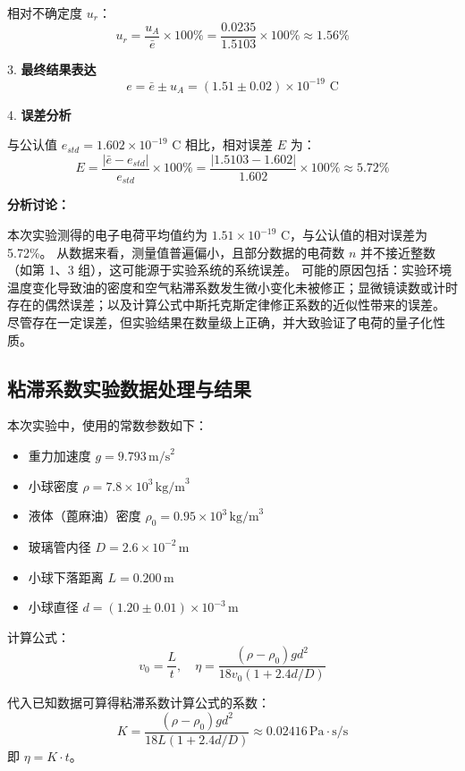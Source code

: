 \documentclass[11pt]{article}
\begin{document}
相对不确定度 $u_r$：
\[ u_r = \frac{u_A}{\bar{e}} \times 100\% = \frac{0.0235}{1.5103} \times 100\% \approx 1.56\% \]

3. \textbf{最终结果表达}
\[ e = \bar{e} \pm u_A = (1.51 \pm 0.02) \times 10^{-19} \text{ C} \]

4. \textbf{误差分析}

与公认值 $e_{std} = 1.602 \times 10^{-19} \text{ C}$ 相比，相对误差 $E$ 为：
\[ E = \frac{|\bar{e} - e_{std}|}{e_{std}} \times 100\% = \frac{|1.5103 - 1.602|}{1.602} \times 100\% \approx 5.72\% \]

\textbf{分析讨论：}

本次实验测得的电子电荷平均值约为 $1.51 \times 10^{-19} \text{ C}$，与公认值的相对误差为 5.72\%。
从数据来看，测量值普遍偏小，且部分数据的电荷数 $n$ 并不接近整数（如第 1、3 组），这可能源于实验系统的系统误差。
可能的原因包括：实验环境温度变化导致油的密度和空气粘滞系数发生微小变化未被修正；显微镜读数或计时存在的偶然误差；以及计算公式中斯托克斯定律修正系数的近似性带来的误差。
尽管存在一定误差，但实验结果在数量级上正确，并大致验证了电荷的量子化性质。

\subsection{粘滞系数实验数据处理与结果}

本次实验中，使用的常数参数如下：
\begin{itemize}
    \item 重力加速度 $g = 9.793 \, \text{m/s}^2$
    \item 小球密度 $\rho = 7.8 \times 10^3 \, \text{kg/m}^3$
    \item 液体（蓖麻油）密度 $\rho_0 = 0.95 \times 10^3 \, \text{kg/m}^3$
    \item 玻璃管内径 $D = 2.6 \times 10^{-2} \, \text{m}$
    \item 小球下落距离 $L = 0.200 \, \text{m}$
    \item 小球直径 $d = (1.20 \pm 0.01) \times 10^{-3} \, \text{m}$
\end{itemize}

计算公式：
\[ v_0 = \frac{L}{t}, \quad \eta = \frac{(\rho - \rho_0)gd^2}{18v_0(1 + 2.4 d/D)} \]

代入已知数据可算得粘滞系数计算公式的系数：
\[ K = \frac{(\rho - \rho_0)gd^2}{18 L (1 + 2.4 d/D)} \approx 0.02416 \, \text{Pa}\cdot\text{s/s} \]
即 $\eta = K \cdot t$。
\end{document}
